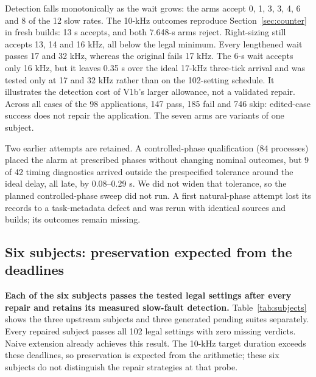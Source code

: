 \documentclass[sigconf,nonacm,balance=false]{acmart}
\begin{document}
Detection falls monotonically as the wait grows: the arms accept 0, 1, 3, 3, 4, 6 and 8 of the 12 slow rates. The 10-kHz outcomes reproduce Section~\ref{sec:counter} in fresh builds: 13 s accepts, and both 7.648-s arms reject. Right-sizing still accepts 13, 14 and 16 kHz, all below the legal minimum. Every lengthened wait passes 17 and 32 kHz, whereas the original fails 17 kHz. The 6-s wait accepts only 16 kHz, but it leaves 0.35 s over the ideal 17-kHz three-tick arrival and was tested only at 17 and 32 kHz rather than on the 102-setting schedule. It illustrates the detection cost of V1b's larger allowance, not a validated repair. Across all cases of the 98 applications, 147 pass, 185 fail and 746 skip: edited-case success does not repair the application. The seven arms are variants of one subject.

Two earlier attempts are retained. A controlled-phase qualification (84 processes) placed the alarm at prescribed phases without changing nominal outcomes, but 9 of 42 timing diagnostics arrived outside the prespecified tolerance around the ideal delay, all late, by 0.08--0.29 s. We did not widen that tolerance, so the planned controlled-phase sweep did not run. A first natural-phase attempt lost its records to a task-metadata defect and was rerun with identical sources and builds; its outcomes remain missing.

\subsection{Six subjects: preservation expected from the deadlines}
\textbf{Each of the six subjects passes the tested legal settings after every repair and retains its measured slow-fault detection.} Table~\ref{tab:subjects} shows the three upstream subjects and three generated pending suites separately. Every repaired subject passes all 102 legal settings with zero missing verdicts. Naive extension already achieves this result. The 10-kHz target duration exceeds these deadlines, so preservation is expected from the arithmetic; these six subjects do not distinguish the repair strategies at that probe.

\begin{table}[t]
\caption{The six originally sensitive subjects. Each repair is compared with the same subject's V0 records. All six detect the slow fault in V0 and each repair, with no missing outcomes.}
\label{tab:subjects}\small\centering

\end{table}
\end{document}

